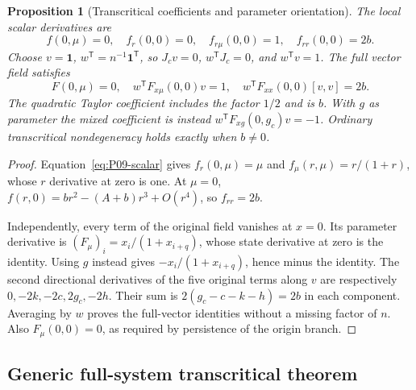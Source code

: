 \documentclass[11pt]{article}
\newcommand{\one}{\mathbf{1}}
\newtheorem{proposition}[theorem]{Proposition}
\theoremstyle{definition}
\theoremstyle{remark}
\begin{document}
\begin{proposition}[Transcritical coefficients and parameter orientation]
\label{prop:P09-coefficients}
The local scalar derivatives are
\begin{equation}
 f(0,\mu)=0,\quad f_r(0,0)=0,\quad
 f_{r\mu}(0,0)=1,\quad f_{rr}(0,0)=2b.
 \label{eq:P09-scalar-coefficients}
\end{equation}
Choose $v=\one$, $w^{\mathsf T}=n^{-1}\one^{\mathsf T}$, so
$J_cv=0$, $w^{\mathsf T}J_c=0$, and $w^{\mathsf T}v=1$.
The full vector field satisfies
\begin{equation}
 F(0,\mu)=0,\quad w^{\mathsf T}F_{x\mu}(0,0)v=1,\quad
 w^{\mathsf T}F_{xx}(0,0)[v,v]=2b.
 \label{eq:P09-full-coefficients}
\end{equation}
The quadratic Taylor coefficient includes the factor $1/2$ and is $b$.
With $g$ as parameter the mixed coefficient is instead
$w^{\mathsf T}F_{xg}(0,g_c)v=-1$. Ordinary transcritical
nondegeneracy holds exactly when $b\ne0$.
\end{proposition}
\begin{proof}
Equation~\eqref{eq:P09-scalar} gives $f_r(0,\mu)=\mu$ and
$f_\mu(r,\mu)=r/(1+r)$, whose $r$ derivative at zero is one.
At $\mu=0$, $f(r,0)=br^2-(A+b)r^3+O(r^4)$, so $f_{rr}=2b$.

Independently, every term of the original field vanishes at $x=0$.
Its parameter derivative is $(F_\mu)_i=x_i/(1+x_{i+q})$,
whose state derivative at zero is the identity. Using $g$ instead
gives $-x_i/(1+x_{i+q})$, hence minus the identity.
The second directional derivatives of the five original terms along $v$
are respectively $0,-2k,-2c,2g_c,-2h$. Their sum is
$2(g_c-c-k-h)=2b$ in each component. Averaging by $w$ proves the
full-vector identities without a missing factor of $n$. Also
$F_\mu(0,0)=0$, as required by persistence of the origin branch.
\end{proof}

\subsection{Generic full-system transcritical theorem}
\label{slot:P09-2}
\end{document}
